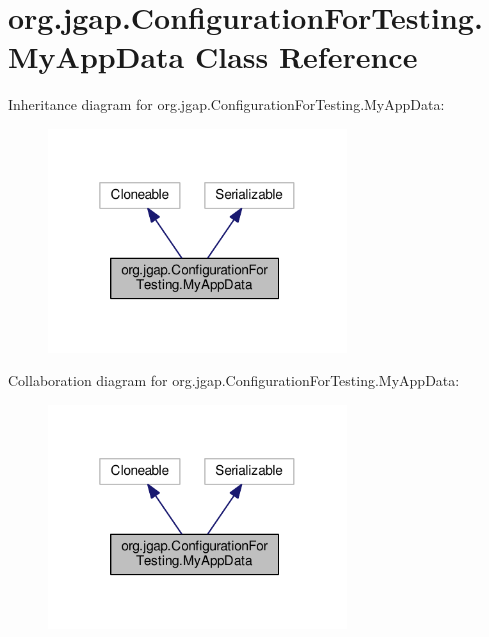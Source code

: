 \hypertarget{classorg_1_1jgap_1_1_configuration_for_testing_1_1_my_app_data}{\section{org.\-jgap.\-Configuration\-For\-Testing.\-My\-App\-Data Class Reference}
\label{classorg_1_1jgap_1_1_configuration_for_testing_1_1_my_app_data}
}


Inheritance diagram for org.\-jgap.\-Configuration\-For\-Testing.\-My\-App\-Data\-:
\nopagebreak
\begin{figure}[H]
\begin{center}
\leavevmode
\includegraphics[width=224pt]{classorg_1_1jgap_1_1_configuration_for_testing_1_1_my_app_data__inherit__graph}
\end{center}
\end{figure}


Collaboration diagram for org.\-jgap.\-Configuration\-For\-Testing.\-My\-App\-Data\-:
\nopagebreak
\begin{figure}[H]
\begin{center}
\leavevmode
\includegraphics[width=224pt]{classorg_1_1jgap_1_1_configuration_for_testing_1_1_my_app_data__coll__graph}
\end{center}
\end{figure}

